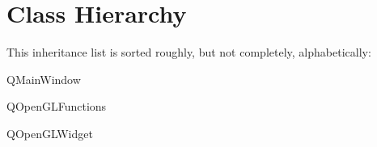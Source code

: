 \section{Class Hierarchy}
This inheritance list is sorted roughly, but not completely, alphabetically\+:\begin{DoxyCompactList}
\item Q\+Main\+Window\begin{DoxyCompactList}
\item {}
\end{DoxyCompactList}
\item Q\+Open\+G\+L\+Functions\begin{DoxyCompactList}
\item {}
\end{DoxyCompactList}
\item Q\+Open\+G\+L\+Widget\begin{DoxyCompactList}
\item {}
\end{DoxyCompactList}
\item {}
\item {}
\end{DoxyCompactList}
